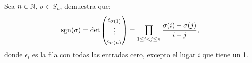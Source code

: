 \documentclass[12pt,a4paper]{article}
\begin{document}
    \begin{mdframed}[style=mdpinkbox,frametitle={Ejercicio 5}]
        Sea $n\in\mathbb{N}$, $\sigma\in S_{n}$, demuestra que:
        \begin{equation*}
            \operatorname{sgn}(\sigma)=\det
            \begin{pmatrix}
                \epsilon_{\sigma(1)}\\
                \vdots\\
                \epsilon_{\sigma(n)}
            \end{pmatrix}
            =\prod_{1\leq i< j\leq n}\frac{\sigma(i)-\sigma(j)}{i-j},
        \end{equation*}
        donde $\epsilon_{i}$ es la fila con todas las entradas cero, excepto el lugar $i$
        que tiene un 1. 
    \end{mdframed}
\end{document}
